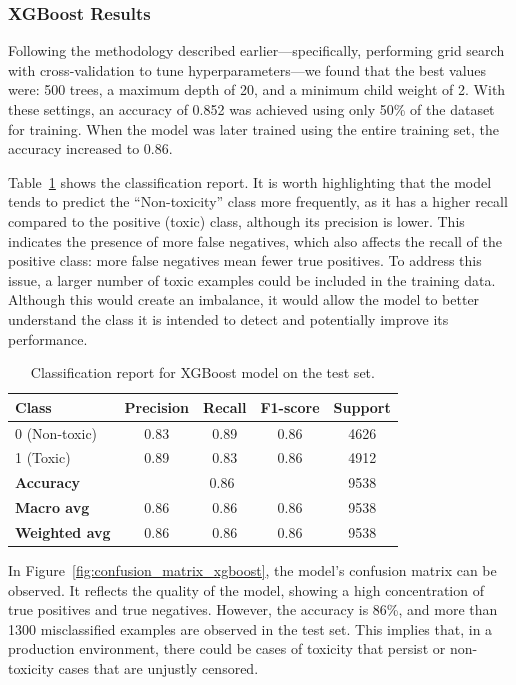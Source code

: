 \subsubsection{XGBoost Results}

Following the methodology described earlier—specifically, performing grid search with cross-validation to tune hyperparameters—we found that the best values were: 500 trees, a maximum depth of 20, and a minimum child weight of 2. With these settings, an accuracy of 0.852 was achieved using only 50\% of the dataset for training. When the model was later trained using the entire training set, the accuracy increased to 0.86.

Table~\ref{tab:xgboost_classification_report} shows the classification report. It is worth highlighting that the model tends to predict the “Non-toxicity” class more frequently, as it has a higher recall compared to the positive (toxic) class, although its precision is lower. This indicates the presence of more false negatives, which also affects the recall of the positive class: more false negatives mean fewer true positives. To address this issue, a larger number of toxic examples could be included in the training data. Although this would create an imbalance, it would allow the model to better understand the class it is intended to detect and potentially improve its performance.

\begin{table}[htbp]
\centering
\caption{Classification report for XGBoost model on the test set.}
\label{tab:xgboost_classification_report}
\begin{tabular}{lcccc}
\toprule
\textbf{Class} & \textbf{Precision} & \textbf{Recall} & \textbf{F1-score} & \textbf{Support} \\
\midrule
0 (Non-toxic)   & 0.83 & 0.89 & 0.86 & 4626 \\
1 (Toxic)       & 0.89 & 0.83 & 0.86 & 4912 \\
\midrule
\textbf{Accuracy}       & \multicolumn{3}{c}{0.86} & 9538 \\
\textbf{Macro avg}      & 0.86 & 0.86 & 0.86 & 9538 \\
\textbf{Weighted avg}   & 0.86 & 0.86 & 0.86 & 9538 \\
\bottomrule
\end{tabular}
\end{table}

In Figure~\ref{fig:confusion_matrix_xgboost}, the model's confusion matrix can be observed. It reflects the quality of the model, showing a high concentration of true positives and true negatives. However, the accuracy is 86\%, and more than 1300 misclassified examples are observed in the test set. This implies that, in a production environment, there could be cases of toxicity that persist or non-toxicity cases that are unjustly censored.

